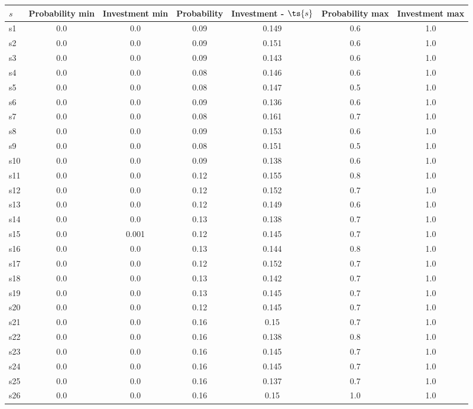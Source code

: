 \documentclass{article}
\begin{document}
\noindent\begin{tabular}{|l|c|c|c|c|c|c|}
\hline
$s$& Probability min & Investment min & Probability & Investment - $\ts{s}$ & Probability max & Investment max\\
\hline
s1 &0.0 & 0.0 & 0.09 & 0.149 & 0.6 & 1.0\\
\hline
s2 &0.0 & 0.0 & 0.09 & 0.151 & 0.6 & 1.0\\
\hline
s3 &0.0 & 0.0 & 0.09 & 0.143 & 0.6 & 1.0\\
\hline
s4 &0.0 & 0.0 & 0.08 & 0.146 & 0.6 & 1.0\\
\hline
s5 &0.0 & 0.0 & 0.08 & 0.147 & 0.5 & 1.0\\
\hline
s6 &0.0 & 0.0 & 0.09 & 0.136 & 0.6 & 1.0\\
\hline
s7 &0.0 & 0.0 & 0.08 & 0.161 & 0.7 & 1.0\\
\hline
s8 &0.0 & 0.0 & 0.09 & 0.153 & 0.6 & 1.0\\
\hline
s9 &0.0 & 0.0 & 0.08 & 0.151 & 0.5 & 1.0\\
\hline
s10 &0.0 & 0.0 & 0.09 & 0.138 & 0.6 & 1.0\\
\hline
s11 &0.0 & 0.0 & 0.12 & 0.155 & 0.8 & 1.0\\
\hline
s12 &0.0 & 0.0 & 0.12 & 0.152 & 0.7 & 1.0\\
\hline
s13 &0.0 & 0.0 & 0.12 & 0.149 & 0.6 & 1.0\\
\hline
s14 &0.0 & 0.0 & 0.13 & 0.138 & 0.7 & 1.0\\
\hline
s15 &0.0 & 0.001 & 0.12 & 0.145 & 0.7 & 1.0\\
\hline
s16 &0.0 & 0.0 & 0.13 & 0.144 & 0.8 & 1.0\\
\hline
s17 &0.0 & 0.0 & 0.12 & 0.152 & 0.7 & 1.0\\
\hline
s18 &0.0 & 0.0 & 0.13 & 0.142 & 0.7 & 1.0\\
\hline
s19 &0.0 & 0.0 & 0.13 & 0.145 & 0.7 & 1.0\\
\hline
s20 &0.0 & 0.0 & 0.12 & 0.145 & 0.7 & 1.0\\
\hline
s21 &0.0 & 0.0 & 0.16 & 0.15 & 0.7 & 1.0\\
\hline
s22 &0.0 & 0.0 & 0.16 & 0.138 & 0.8 & 1.0\\
\hline
s23 &0.0 & 0.0 & 0.16 & 0.145 & 0.7 & 1.0\\
\hline
s24 &0.0 & 0.0 & 0.16 & 0.145 & 0.7 & 1.0\\
\hline
s25 &0.0 & 0.0 & 0.16 & 0.137 & 0.7 & 1.0\\
\hline
s26 &0.0 & 0.0 & 0.16 & 0.15 & 1.0 & 1.0\\
\hline

\end{tabular}
\end{document}
